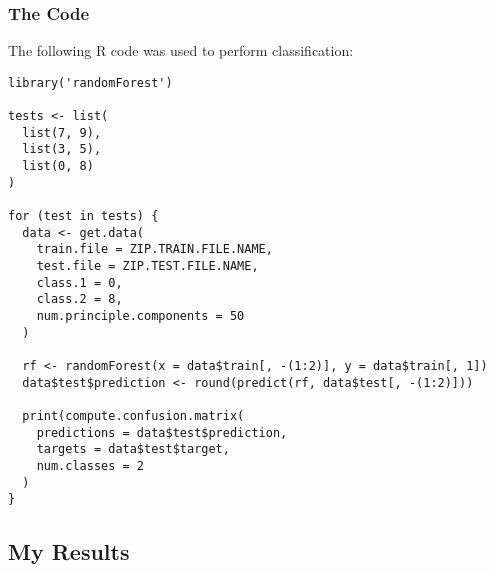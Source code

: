 \documentclass{article}
\begin{document}
\subsubsection{The Code}
The following R code was used to perform classification:
\begin{verbatim}
library('randomForest')

tests <- list(
  list(7, 9),
  list(3, 5),
  list(0, 8)
)

for (test in tests) {
  data <- get.data(
    train.file = ZIP.TRAIN.FILE.NAME,
    test.file = ZIP.TEST.FILE.NAME,
    class.1 = 0,
    class.2 = 8,
    num.principle.components = 50
  )
  
  rf <- randomForest(x = data$train[, -(1:2)], y = data$train[, 1])
  data$test$prediction <- round(predict(rf, data$test[, -(1:2)]))
  
  print(compute.confusion.matrix(
    predictions = data$test$prediction,
    targets = data$test$target,
    num.classes = 2
  )
}
\end{verbatim}
%
%
%
\subsection{My Results}
%
\end{document}
